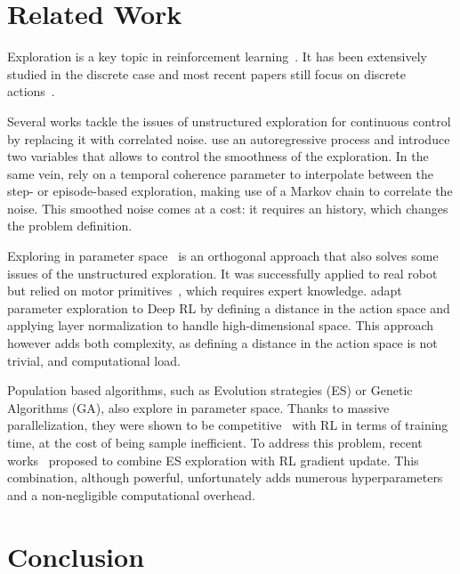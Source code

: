 \documentclass{article}
\begin{document}
\section{Related Work}


Exploration is a key topic in reinforcement learning~\citep{sutton2018reinforcement}. It has been extensively studied in the discrete case and most recent papers still focus on discrete actions~\cite{bellemare2016unifying, osband2016deep, fortunato2018noisy, osband2018randomized}.

Several works tackle the issues of unstructured exploration for continuous control by replacing it with correlated noise. \citet{korenkevych2019autoregressive} use an autoregressive process and introduce two variables that allows to control the smoothness of the exploration. In the same vein, \citet{hoof2017generalized} rely on a temporal coherence parameter to interpolate between the step- or episode-based exploration, making use of a Markov chain to correlate the noise. This smoothed noise comes at a cost: it requires an history, which changes the problem definition.


Exploring in parameter space~\cite{kober2009policy, sehnke2010parameter, ruckstiess2010exploring, stulp2013robot, mania2018simple, sigaud2019policy} is an orthogonal approach that also solves some issues of the unstructured exploration. It was successfully applied to real robot but relied on motor primitives~\citep{peters2008reinforcement, stulp2013robot}, which requires expert knowledge.
\citet{plappert2017parameter} adapt parameter exploration to Deep RL by defining a distance in the action space and applying layer normalization to handle high-dimensional space. This approach however adds both complexity, as defining a distance in the action space is not trivial, and computational load.

Population based algorithms, such as Evolution strategies (ES) or Genetic Algorithms (GA), also explore in parameter space. Thanks to massive parallelization, they were shown to be competitive~\cite{salimans2017evolution, such2017deep} with RL in terms of training time, at the cost of being sample inefficient. To address this problem, recent works~\cite{khadka2018evolution, pourchot2018cem} proposed to combine ES exploration with RL gradient update. This combination, although powerful, unfortunately adds numerous hyperparameters and a non-negligible computational overhead.




\section{Conclusion}
\end{document}
